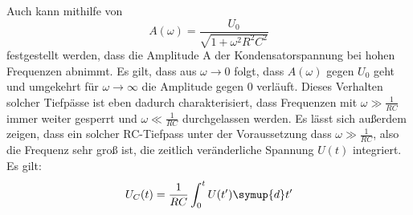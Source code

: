 Auch kann mithilfe von
\begin{equation}
A(\omega) = \frac{U_0}{\sqrt{1+\omega^2R^2C^2}}
\label{eq:tiefpass}
\end{equation}
festgestellt werden, dass die Amplitude A der Kondensatorspannung bei hohen Frequenzen
abnimmt.\newline
Es gilt, dass aus $\omega \to 0$  folgt, dass $A(\omega)$ gegen $U_0$ geht
und umgekehrt für $\omega \to \infty$ die Amplitude gegen 0 verläuft.\newline
Dieses Verhalten solcher Tiefpässe ist eben dadurch charakterisiert, dass
Frequenzen mit $\omega \gg \frac{1}{RC}$ immer weiter gesperrt und
$\omega \ll \frac{1}{RC}$ durchgelassen werden.\newline
Es lässt sich außerdem zeigen, dass ein solcher RC-Tiefpass unter der Voraussetzung dass $\omega \gg \frac{1}{RC}$,
also die Frequenz sehr groß ist, die zeitlich veränderliche Spannung $U(t)$ integriert.\newline
Es gilt:
\begin{equation}
  U_C(t) = \frac{1}{RC}\int_0^t U(t')\symup{d}t'
  \label{eq:integrator}
\end{equation}
